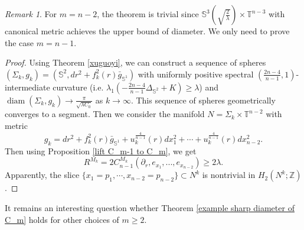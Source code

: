 \documentclass[11pt,letterpaper]{amsart}
\theoremstyle{definition}
\theoremstyle{remark}
\newtheorem{remark}[theorem]{Remark}
\numberwithin{equation}{section}
\begin{document}
\begin{remark}
     For $m=n-2$, the theorem is trivial since  $\mathbb{S}^{3}(\sqrt{\frac{2}{\lambda}})\times \mathbb{T}^{n-3}$ with canonical metric achieves the upper bound of diameter. We only need to prove the case $m=n-1.$
\end{remark}

\begin{proof}
    Using Theorem \ref{xuguoyi}, we can construct a sequence of spheres $(\Sigma_{k},g_{k})=(\mathbb{S}^{2},dr^2+ f_{k}^{2}(r)\bar{g}_{\mathbb{S}^{1}})$ with uniformly positive spectral $(\frac{2n-4}{n-1},1)$-intermediate curvature (i.e. $\lambda_{1}(-\frac{2n-4}{n-1}\Delta_{\mathbb{S}^2}+K)\geq \lambda$) and $\operatorname{diam}(\Sigma_{k},g_{k})\rightarrow \frac{\pi}{\sqrt{\lambda C_{0}}}$ as $k\rightarrow \infty$. This sequence of spheres geometrically converges to a segment. Then we consider the manifold $N=\Sigma_{k}\times \mathbb{T}^{n-2}$ with metric $$g_{k}=dr^2+f^{2}_{k}(r)\bar{g}_{\mathbb{S}^1}+u_{k}^{\frac{4}{n-1}}(r)dx_{1}^{2}+\cdots +u_{k}^{\frac{4}{n-1}}(r)dx_{n-2}^2.$$
Then using Proposition \ref{lift C_m-1 to C_m}, we get
\[
R^{M_{k}}=2C_{n-1}^{M_{k}}(\partial_{r},e_{x_{1}},...,e_{x_{n-2}})\geq 2\lambda. 
\]     
Apparently, the slice $\{x_{1}=p_{1},\cdots,x_{n-2}=p_{n-2}\}\subset N^k$ is nontrivial in $H_{2}(N^k;\mathbb{Z})$.
\end{proof}

It remains an interesting question whether Theorem \ref{example sharp diameter of C_m} holds for other choices of $m\geq 2.$




\end{document}
